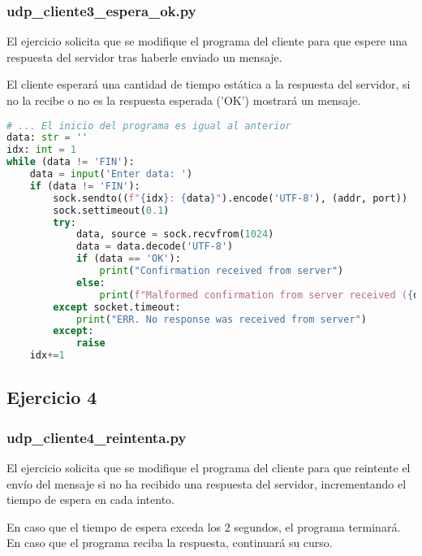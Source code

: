 \subsubsection{udp\_cliente3\_espera\_ok.py}

El ejercicio solicita que se modifique el programa del cliente para que espere una respuesta del servidor
tras haberle enviado un mensaje.

El cliente esperará una cantidad de tiempo estática a la respuesta del servidor, si no la recibe o
no es la respuesta esperada ('OK') mostrará un mensaje.

\begin{lstlisting}[language=Python]
# ... El inicio del programa es igual al anterior
data: str = ''
idx: int = 1
while (data != 'FIN'):
    data = input('Enter data: ')
    if (data != 'FIN'):
        sock.sendto((f"{idx}: {data}").encode('UTF-8'), (addr, port))
        sock.settimeout(0.1)
        try:
            data, source = sock.recvfrom(1024)
            data = data.decode('UTF-8')
            if (data == 'OK'):
                print("Confirmation received from server")
            else:
                print(f"Malformed confirmation from server received ({data})")
        except socket.timeout:
            print("ERR. No response was received from server")
        except:
            raise
    idx+=1
\end{lstlisting}

\subsection{Ejercicio 4}

\subsubsection{udp\_cliente4\_reintenta.py}

El ejercicio solicita que se modifique el programa del cliente para que reintente el envío del mensaje
si no ha recibido una respuesta del servidor, incrementando el tiempo de espera en cada intento.

En caso que el tiempo de espera exceda los 2 segundos, el programa terminará.
En caso que el programa reciba la respuesta, continuará su curso.

